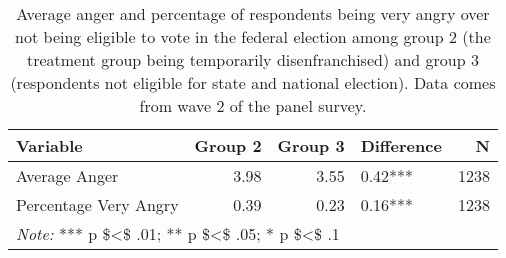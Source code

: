 \begin{table}[h]

\caption{\label{tab:t_a:anger}Average anger and percentage of respondents being very 
              angry over not being eligible to vote in the federal election among group 
              2 (the treatment group being temporarily disenfranchised) and group 3 
              (respondents not eligible for state and national election). Data comes 
              from wave 2 of the panel survey.}
\centering
\begin{tabular}[t]{lrrlr}
\toprule
Variable & Group 2 & Group 3 & Difference & N\\
\midrule
Average Anger & 3.98 & 3.55 & 0.42*** & 1238\\
Percentage Very Angry & 0.39 & 0.23 & 0.16*** & 1238\\
\bottomrule
\multicolumn{5}{l}{\rule{0pt}{1em}\textit{Note: } *** p \$<\$ .01; ** p \$<\$ .05; * p \$<\$ .1}\\
\end{tabular}
\end{table}
